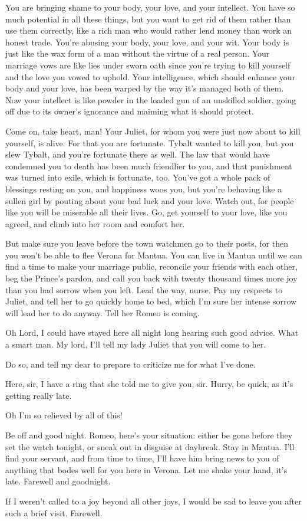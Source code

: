 \documentclass[12pt]{sides}
\newcommand{\brepl}[1]{\repl{\bf #1}}
\newcommand{\talkromeo}{\brepl{Romeo}}
\newcommand{\talklawrence}{\brepl{Friar Lawrence}}
\newcommand{\talkangelica}{\brepl{Angelica}}
\begin{document}
You are bringing shame to your body, your love, and your intellect. You have so much potential in all these things, but you want to get rid of them rather than use them correctly, like a rich man who would rather lend money than work an honest trade. You're abusing your body, your love, and your wit. Your body is just like the wax form of a man without the virtue of a real person. Your marriage vows are like lies under sworn oath since you're trying to kill yourself and the love you vowed to uphold. Your intelligence, which should enhance your body and your love, has been warped by the way it's managed both of them. Now your intellect is like powder in the loaded gun of an unskilled soldier, going off due to its owner's ignorance and maiming what it should protect.

Come on, take heart, man! Your Juliet, for whom you were just now about to kill yourself, is alive. For that you are fortunate. Tybalt wanted to kill you, but you slew Tybalt, and you're fortunate there as well. The law that would have condemned you to death has been much friendlier to you, and that punishment was turned into exile, which is fortunate, too. You've got a whole pack of blessings resting on you, and happiness woos you, but you're behaving like a sullen girl by pouting about your bad luck and your love. Watch out, for people like you will be miserable all their lives. Go, get yourself to your love, like you agreed, and climb into her room and comfort her.

But make sure you leave before the town watchmen go to their posts, for then you won't be able to flee Verona for Mantua. You can live in Mantua until we can find a time to make your marriage public, reconcile your friends with each other, beg the Prince's pardon, and call you back with twenty thousand times more joy than you had sorrow when you left. Lead the way, nurse. Pay my respects to Juliet, and tell her to go quickly home to bed, which I'm sure her intense sorrow will lead her to do anyway. Tell her Romeo is coming.

\talkangelica
Oh Lord, I could have stayed here all night long hearing such good advice. What a smart man. My lord, I'll tell my lady Juliet that you will come to her.

\talkromeo
Do so, and tell my dear to prepare to criticize me for what I've done.

\talkangelica
Here, sir, I have a ring that she told me to give you, sir. Hurry, be quick, as it's getting really late.

\talkromeo
Oh I'm so relieved by all of this!

\talklawrence
Be off and good night. Romeo, here's your situation: either be gone before they set the watch tonight, or sneak out in disguise at daybreak. Stay in Mantua. I'll find your servant, and from time to time, I'll have him bring news to you of anything that bodes well for you here in Verona. Let me shake your hand, it's late. Farewell and goodnight.

\talkromeo
If I weren't called to a joy beyond all other joys, I would be sad to leave you after such a brief visit. Farewell.
\end{document}
